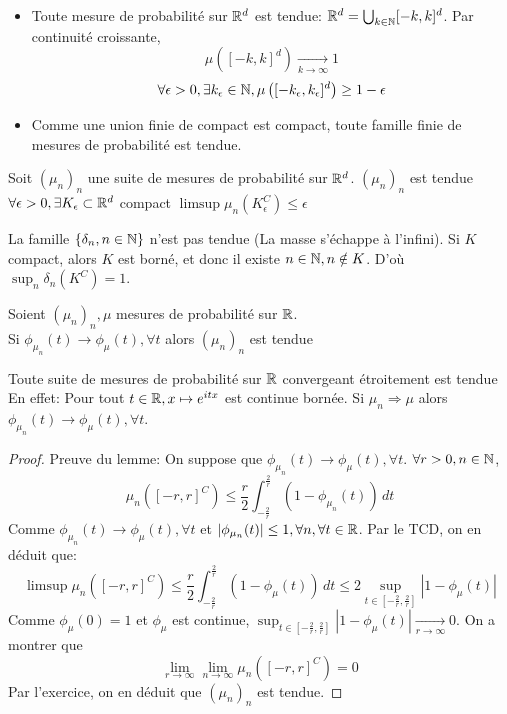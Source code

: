 \documentclass[]{report}
\begin{document}
    \begin{re}{}{}
        \begin{itemize}
            \item Toute mesure de probabilité sur $\mathbb{R}^d$ est tendue: $\mathbb{R}^d=\bigcup_{k\in \mathbb{N}}[-k,k]^d$. Par continuité croissante,
            \[\mu\left([-k,k]^d\right)\underset{k\to \infty}{\longrightarrow}1\]
            \[\forall \epsilon>0,\exists k_\epsilon\in \mathbb{N}, \mu\left([-k_\epsilon,k_\epsilon]^d\right)\ge 1-\epsilon\]
            \item Comme une union finie de compact est compact, toute famille finie de mesures de probabilité est tendue.
        \end{itemize}
    \end{re}

    \begin{exo}{}{}
        Soit $(\mu_n)_n$ une suite de mesures de probabilité sur $\mathbb{R}^d$. $(\mu_n)_n$ est tendue \ssi $\forall \epsilon>0,\exists K_\epsilon\subset \mathbb{R}^d$ compact $\limsup \mu_n(K_\epsilon^C)\le \epsilon$
    \end{exo}

    \begin{ex}{}{}
        La famille $\{\delta_n,n\in \mathbb{N}\}$ n'est pas tendue (La masse s'échappe à l'infini). Si $K$ compact, alors $K$ est borné, et donc il existe $n\in \mathbb{N},n\notin K$. D'où $\sup_n \delta_n(K^C)=1$.
    \end{ex}

    \begin{lm}{}{}
        Soient $(\mu_n)_n,\mu$ mesures de probabilité sur $\mathbb{R}$.\\
        Si $\phi_{\mu_n}(t)\longrightarrow \phi_\mu(t),\forall t$ alors $(\mu_n)_n$ est tendue
    \end{lm}

    \begin{cor}{}{}
        Toute suite de mesures de probabilité sur $\mathbb{R}$ convergeant étroitement est tendue\\
        En effet: Pour tout $t\in \mathbb{R},x\mapsto e^{itx}$ est continue bornée. Si $\mu_n\Longrightarrow \mu$ alors $\phi_{\mu_n}(t)\longrightarrow \phi_{\mu}(t),\forall t$.
    \end{cor}

    \begin{proof}
        Preuve du lemme: On suppose que $\phi_{\mu_n}(t)\longrightarrow \phi_\mu(t),\forall t$. $\forall r>0,n\in \mathbb{N}$,
        \[\mu_n\left([-r,r]^C\right)\le \frac{r}{2}\int_{-\frac{2}{r}}^{\frac{2}{r}}\left(1-\phi_{\mu_n}(t)\right)\,dt\]
        Comme $\phi_{\mu_n}(t)\longrightarrow\phi_\mu(t),\forall t$ et $\left|\phi_{\mu_n}(t)\right|\le 1,\forall n,\forall t\in \mathbb{R}$. Par le TCD, on en déduit que:
        \[\limsup \mu_n\left([-r,r]^C\right)\le \frac{r}{2}\int_{-\frac{2}{r}}^{\frac{2}{r}}\left(1-\phi_\mu(t)\right)\, dt\le 2\sup_{t\in[-\frac{2}{r},\frac{2}{r}]}|1-\phi_\mu(t)|\]
        Comme $\phi_\mu(0)=1$ et $\phi_\mu$ est continue, $\sup_{t\in[-\frac{2}{r},\frac{2}{r}]}|1-\phi_\mu(t)|\underset{r\to \infty}{\longrightarrow}0$. On a montrer que
        \[\lim_{r\to \infty}\lim_{n\to \infty}\mu_n([-r,r]^C)=0\]
        Par l'exercice, on en déduit que $(\mu_n)_n$ est tendue.
    \end{proof}
\end{document}
